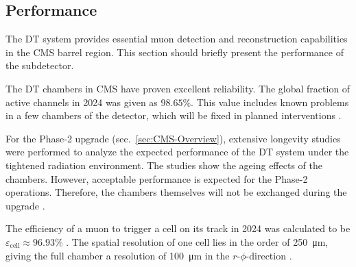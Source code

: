 
\subsection{Performance}
\label{sec:CMS-DTPerformance}
The \ac{DT} system provides essential muon detection and reconstruction capabilities in the \ac{CMS} barrel region. This section should briefly present the performance of the subdetector.
\par The \ac{DT} chambers in \ac{CMS} have proven excellent reliability. The global fraction of active channels in 2024 was given as $98.65\%$. This value includes known problems in a few chambers of the detector, which will be fixed in planned interventions \cite{DT-Performance2024}.
\par For the Phase-2 upgrade (sec.\ \ref{sec:CMS-Overview}), extensive longevity studies were performed to analyze the expected performance of the \ac{DT} system under the tightened radiation environment. The studies show the ageing effects of the chambers. However, acceptable performance is expected for the Phase-2 operations. Therefore, the chambers themselves will not be exchanged during the upgrade \cite{CMS-Phase2Muon}.
\par The efficiency of a muon to trigger a cell on its track in 2024 was calculated to be $\varepsilon_\text{cell}\approx 96.93\%$ \cite{DT-Performance2024}. The spatial resolution of one cell lies in the order of \SI{250}{\micro\meter}, giving the full chamber a resolution of \SI{100}{\micro\meter} in the $r$-$\phi$-direction \cite{CMS-Main}.

\FloatBarrier
